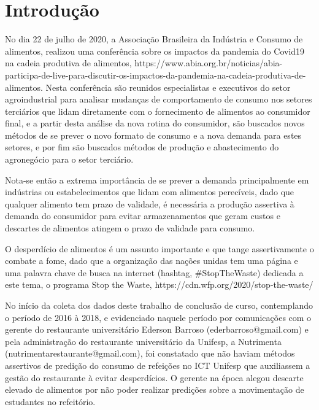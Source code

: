 \chapter{Introdução}


\noindent
{}
No dia 22 de julho de 2020, a Associação Brasileira da Indústria e Consumo de alimentos, realizou uma conferência sobre os impactos da pandemia do Covid19 na cadeia produtiva de alimentos, https://www.abia.org.br/noticias/abia-participa-de-live-para-discutir-os-impactos-da-pandemia-na-cadeia-produtiva-de-alimentos. Nesta conferência são reunidos especialistas e executivos do setor agroindustrial para analisar mudanças de comportamento de consumo nos setores terciários que lidam diretamente com o fornecimento de alimentos ao consumidor final, e a partir desta análise da nova rotina do consumidor, são buscados novos métodos de se prever o novo formato de consumo e a nova demanda para estes setores, e por fim são buscados métodos de produção e abastecimento do agronegócio para o setor terciário.

Nota-se então a extrema importância de se prever a demanda principalmente em indústrias ou estabelecimentos que lidam com alimentos perecíveis, dado que qualquer alimento tem prazo de validade, é necessária a produção assertiva à demanda do consumidor para evitar armazenamentos que geram custos e descartes de alimentos atingem o prazo de validade para consumo.

O desperdício de alimentos é um assunto importante e que tange assertivamente o combate a fome, dado que a organização das nações unidas tem uma página e uma palavra chave de busca na internet (hashtag, \#StopTheWaste) dedicada a este tema, o programa Stop the Waste, https://cdn.wfp.org/2020/stop-the-waste/

No início da coleta dos dados deste trabalho de conclusão de curso, contemplando o período de 2016 à 2018, e evidenciado naquele período por comunicações com o gerente do restaurante universitário Ederson Barroso (ederbarroso@gmail.com) e pela administração do restaurante universitário da Unifesp, a Nutrimenta (nutrimentarestaurante@gmail.com), foi constatado que não haviam métodos assertivos de predição do consumo de refeições no ICT Unifesp que auxiliassem a gestão do restaurante à evitar desperdícios. O gerente na época alegou descarte elevado de alimentos por não poder realizar predições sobre a movimentação de estudantes no refeitório.

